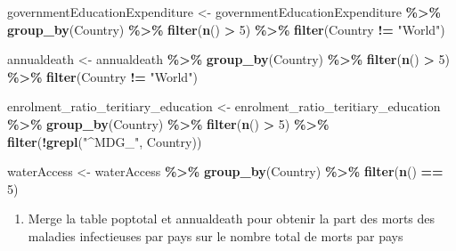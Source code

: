 \documentclass[
]{article}
\newenvironment{Shaded}{\begin{snugshade}}{\end{snugshade}}
\newcommand{\DecValTok}[1]{\textcolor[rgb]{0.00,0.00,0.81}{#1}}
\newcommand{\FunctionTok}[1]{\textcolor[rgb]{0.13,0.29,0.53}{\textbf{#1}}}
\newcommand{\NormalTok}[1]{#1}
\newcommand{\OtherTok}[1]{\textcolor[rgb]{0.56,0.35,0.01}{#1}}
\newcommand{\SpecialCharTok}[1]{\textcolor[rgb]{0.81,0.36,0.00}{\textbf{#1}}}
\newcommand{\StringTok}[1]{\textcolor[rgb]{0.31,0.60,0.02}{#1}}
\providecommand{\tightlist}{%
  \setlength{\itemsep}{0pt}\setlength{\parskip}{0pt}}
\begin{document}
\begin{Shaded}
\begin{Highlighting}[]
\NormalTok{governmentEducationExpenditure }\OtherTok{\textless{}{-}}\NormalTok{ governmentEducationExpenditure }\SpecialCharTok{\%\textgreater{}\%} \FunctionTok{group\_by}\NormalTok{(Country) }\SpecialCharTok{\%\textgreater{}\%} \FunctionTok{filter}\NormalTok{(}\FunctionTok{n}\NormalTok{() }\SpecialCharTok{\textgreater{}} \DecValTok{5}\NormalTok{) }\SpecialCharTok{\%\textgreater{}\%} \FunctionTok{filter}\NormalTok{(Country }\SpecialCharTok{!=} \StringTok{"World"}\NormalTok{)}

\NormalTok{annualdeath }\OtherTok{\textless{}{-}}\NormalTok{ annualdeath }\SpecialCharTok{\%\textgreater{}\%} \FunctionTok{group\_by}\NormalTok{(Country) }\SpecialCharTok{\%\textgreater{}\%} \FunctionTok{filter}\NormalTok{(}\FunctionTok{n}\NormalTok{() }\SpecialCharTok{\textgreater{}} \DecValTok{5}\NormalTok{) }\SpecialCharTok{\%\textgreater{}\%} \FunctionTok{filter}\NormalTok{(Country }\SpecialCharTok{!=} \StringTok{"World"}\NormalTok{)}

\NormalTok{enrolment\_ratio\_teritiary\_education }\OtherTok{\textless{}{-}}\NormalTok{ enrolment\_ratio\_teritiary\_education }\SpecialCharTok{\%\textgreater{}\%} \FunctionTok{group\_by}\NormalTok{(Country) }\SpecialCharTok{\%\textgreater{}\%} \FunctionTok{filter}\NormalTok{(}\FunctionTok{n}\NormalTok{() }\SpecialCharTok{\textgreater{}} \DecValTok{5}\NormalTok{) }\SpecialCharTok{\%\textgreater{}\%} \FunctionTok{filter}\NormalTok{(}\SpecialCharTok{!}\FunctionTok{grepl}\NormalTok{(}\StringTok{"\^{}MDG\_"}\NormalTok{, Country))}

\NormalTok{waterAccess }\OtherTok{\textless{}{-}}\NormalTok{ waterAccess }\SpecialCharTok{\%\textgreater{}\%} \FunctionTok{group\_by}\NormalTok{(Country) }\SpecialCharTok{\%\textgreater{}\%} \FunctionTok{filter}\NormalTok{(}\FunctionTok{n}\NormalTok{() }\SpecialCharTok{==} \DecValTok{5}\NormalTok{)}
\end{Highlighting}
\end{Shaded}

\begin{enumerate}
\def\labelenumi{\alph{enumi})}
\setcounter{enumi}{7}
\tightlist
\item
  Merge la table poptotal et annualdeath pour obtenir la part des morts
  des maladies infectieuses par pays sur le nombre total de morts par
  pays
\end{enumerate}
\end{document}
